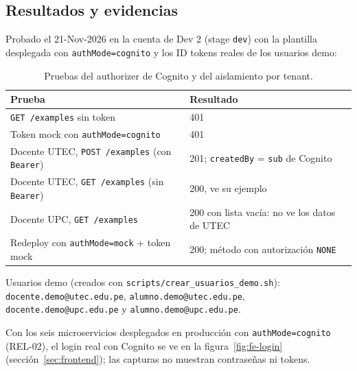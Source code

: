 \subsection{Resultados y evidencias}
Probado el 21-Nov-2026 en la cuenta de Dev 2 (stage \texttt{dev}) con la plantilla desplegada con
\texttt{authMode=cognito} y los ID tokens reales de los usuarios demo:

\begin{table}[htbp]
\centering\small
\begin{tabularx}{\textwidth}{Xl}
\toprule
Prueba & Resultado \\
\midrule
\texttt{GET /examples} sin token & 401 \\
Token mock con \texttt{authMode=cognito} & 401 \\
Docente UTEC, \texttt{POST /examples} (con \texttt{Bearer}) & 201; \texttt{createdBy} = \texttt{sub} de Cognito \\
Docente UTEC, \texttt{GET /examples} (sin \texttt{Bearer}) & 200, ve su ejemplo \\
Docente UPC, \texttt{GET /examples} & 200 con lista vacía: no ve los datos de UTEC \\
Redeploy con \texttt{authMode=mock} + token mock & 200; método con autorización \texttt{NONE} \\
\bottomrule
\end{tabularx}
\caption{Pruebas del authorizer de Cognito y del aislamiento por tenant.}
\label{tab:auth}
\end{table}

Usuarios demo (creados con \texttt{scripts/crear\_usuarios\_demo.sh}):
\texttt{docente.demo@utec.edu.pe}, \texttt{alumno.demo@utec.edu.pe},
\texttt{docente.demo@upc.edu.pe} y \texttt{alumno.demo@upc.edu.pe}.

Con los seis microservicios desplegados en producción con \texttt{authMode=cognito} (REL-02), el login
real con Cognito se ve en la figura~\ref{fig:fe-login} (sección~\ref{sec:frontend}); las capturas no
muestran contraseñas ni tokens.

